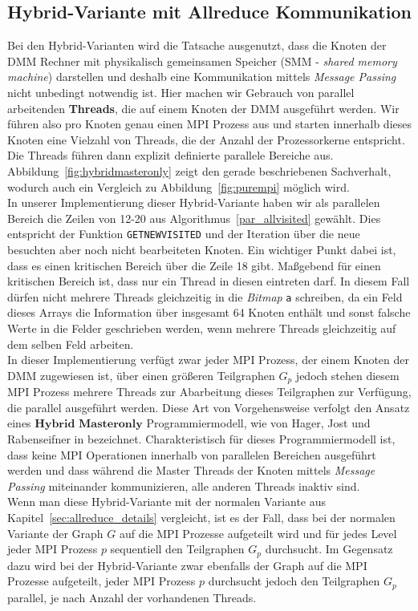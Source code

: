 \documentclass[11pt,a4paper]{article}
\begin{document}
\subsection{Hybrid-Variante mit Allreduce Kommunikation}
Bei den Hybrid-Varianten wird die Tatsache ausgenutzt, dass die Knoten der DMM Rechner mit physikalisch gemeinsamen Speicher (SMM - \textit{shared memory machine}) darstellen und deshalb eine Kommunikation mittels \textit{Message Passing} nicht unbedingt notwendig ist. Hier machen wir Gebrauch von parallel arbeitenden \textbf{Threads}, die auf einem Knoten der DMM ausgeführt werden. Wir führen also pro Knoten genau einen MPI Prozess aus und starten innerhalb dieses Knoten eine Vielzahl von Threads, die der Anzahl der Prozessorkerne entspricht. Die Threads führen dann explizit definierte parallele Bereiche aus. Abbildung~\ref{fig:hybridmasteronly} zeigt den gerade beschriebenen Sachverhalt, wodurch auch ein Vergleich zu Abbildung~\ref{fig:purempi} möglich wird.\\
In unserer Implementierung dieser Hybrid-Variante haben wir als parallelen Bereich die Zeilen von 12-20 aus Algorithmus~\ref{par_allvisited} gewählt. Dies entspricht der Funktion \lstinline{GETNEWVISITED} und der Iteration über die neue besuchten aber noch nicht bearbeiteten Knoten. Ein wichtiger Punkt dabei ist, dass es einen kritischen Bereich über die Zeile 18 gibt. Maßgebend für einen kritischen Bereich ist, dass nur ein Thread in diesen eintreten darf. In diesem Fall dürfen nicht mehrere Threads gleichzeitig in die \textit{Bitmap} \lstinline{a} schreiben, da ein Feld dieses Arrays die Information über insgesamt 64 Knoten enthält und sonst falsche Werte in die Felder geschrieben werden, wenn mehrere Threads gleichzeitig auf dem selben Feld arbeiten.\\
In dieser Implementierung verfügt zwar jeder MPI Prozess, der einem Knoten der DMM zugewiesen ist, über einen größeren Teilgraphen \(G_{p}\) jedoch stehen diesem MPI Prozess mehrere Threads zur Abarbeitung dieses Teilgraphen zur Verfügung, die parallel ausgeführt werden. Diese Art von Vorgehensweise verfolgt den Ansatz eines \textit{$\textbf{Hybrid Masteronly}$} Programmiermodell, wie von Hager, Jost und Rabenseifner in \cite{hybrid} bezeichnet. Charakteristisch für dieses Programmiermodell ist, dass keine MPI Operationen innerhalb von parallelen Bereichen ausgeführt werden und dass während die Master Threads der Knoten mittels \textit{Message Passing} miteinander kommunizieren, alle anderen Threads inaktiv sind.\\
Wenn man diese Hybrid-Variante mit der normalen Variante aus Kapitel~\ref{sec:allreduce_details} vergleicht, ist es der Fall, dass bei der normalen Variante der Graph \(G\) auf die MPI Prozesse aufgeteilt wird und für jedes Level jeder MPI Prozess \(p\) sequentiell den Teilgraphen \(G_{p}\) durchsucht. Im Gegensatz dazu wird bei der Hybrid-Variante zwar ebenfalls der Graph auf die MPI Prozesse aufgeteilt, jeder MPI Prozess \(p\) durchsucht jedoch den Teilgraphen \(G_{p}\) parallel, je nach Anzahl der vorhandenen Threads.
\end{document}
